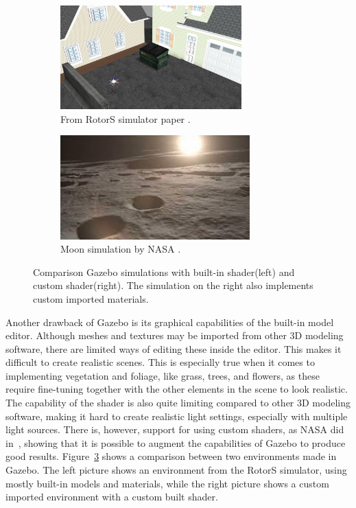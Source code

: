 \begin{figure}[!htb]
    \centering
    \begin{subfigure}{0.45\textwidth}
        \includegraphics[height=4cm]{rapport/fig/Simulator/A-screenshot-of-the-RotorS-simulator-The-scene-is-built-up-from-Gazebo-default-models.png}
        \caption{From RotorS simulator paper \cite{RotorS}.}
        \label{fig:A}
    \end{subfigure}
    \begin{subfigure}{0.45\textwidth}
        \includegraphics[height=4cm]{rapport/fig/Simulator/gazebomoon.jpg}
        \caption{Moon simulation by NASA \cite{NASAGazeboppt}.}
        \label{fig:NASA_Gazebo_moon}
    \end{subfigure}
    \caption{Comparison Gazebo simulations with built-in shader(left) and custom shader(right). The simulation on the right also implements custom imported materials.}
    \label{fig:Gazebo_imgs}
\end{figure}

Another drawback of Gazebo is its graphical capabilities of the built-in model editor. Although meshes and textures may be imported from other 3D modeling software, there are limited ways of editing these inside the editor. This makes it difficult to create realistic scenes. This is especially true when it comes to implementing vegetation and foliage, like grass, trees, and flowers, as these require fine-tuning together with the other elements in the scene to look realistic. The capability of the shader is also quite limiting compared to other 3D modeling software, making it hard to create realistic light settings, especially with multiple light sources. There is, however, support for using custom shaders, as NASA did in~\cite{NASAGazeboppt}, showing that it is possible to augment the capabilities of Gazebo to produce good results. Figure~\ref{fig:Gazebo_imgs} shows a comparison between two environments made in Gazebo. The left picture shows an environment from the RotorS simulator, using mostly built-in models and materials, while the right picture shows a custom imported environment with a custom built shader.

